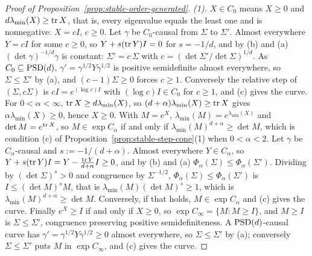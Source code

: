 \begin{proof}[Proof of Proposition~\ref{prop:stable-order-generated}]
\emph{(1).} $X \in C_0$ means $X \ge 0$ and $d\lambda_{\min}(X) \ge \operatorname{tr} X$, that is, every eigenvalue equals the
least one and is nonnegative: $X = cI$, $c \ge 0$. Let $\gamma$ be $C_0$-causal from $\Sigma$ to $\Sigma'$.
Almost everywhere $Y = cI$ for some $c \ge 0$, so $Y + s(\operatorname{tr} Y)I = 0$ for $s = -1/d$, and by (b) and (a)
$(\det\gamma)^{-1/d}\gamma$ is constant: $\Sigma' = c\,\Sigma$ with $c = (\det\Sigma'/\det\Sigma)^{1/d}$. As
$C_0 \subseteq \mathrm{PSD}(d)$, $\gamma' = \gamma^{1/2}Y\gamma^{1/2}$ is positive semidefinite almost everywhere, so
$\Sigma \le \Sigma'$ by (a), and $(c - 1)\Sigma \ge 0$ forces $c \ge 1$. Conversely the relative step of
$(\Sigma, c\Sigma)$ is $cI = e^{(\log c)I}$ with $(\log c)I \in C_0$ for $c \ge 1$, and (c) gives the curve.
For $0 < \alpha < \infty$, $\operatorname{tr} X \ge d\lambda_{\min}(X)$, so
$(d+\alpha)\lambda_{\min}(X) \ge \operatorname{tr} X$ gives $\alpha\lambda_{\min}(X) \ge 0$, hence $X \ge 0$. With
$M = e^X$, $\lambda_{\min}(M) = e^{\lambda_{\min}(X)}$ and $\det M = e^{\operatorname{tr} X}$, so $M \in \exp C_\alpha$ if and
only if $\lambda_{\min}(M)^{d+\alpha} \ge \det M$, which is condition (c) of Proposition~\ref{prop:stable-step-cone}(1)
when $0 < \alpha < 2$. Let $\gamma$ be $C_\alpha$-causal and $s := -1/(d+\alpha)$. Almost everywhere $Y \in
C_\alpha$, so $Y + s(\operatorname{tr} Y)I = Y - \frac{\operatorname{tr} Y}{d+\alpha}I \ge 0$, and by (b) and (a) $\Phi_\alpha(\Sigma) \le
\Phi_\alpha(\Sigma')$. Dividing by $(\det\Sigma)^s > 0$ and congruence by $\Sigma^{-1/2}$, $\Phi_\alpha(\Sigma)
\le \Phi_\alpha(\Sigma')$ is $I \le (\det M)^sM$, that is $\lambda_{\min}(M)(\det M)^s \ge 1$, which is
$\lambda_{\min}(M)^{d+\alpha} \ge \det M$. Conversely, if that holds, $M \in \exp C_\alpha$ and (c) gives the
curve. Finally $e^X \ge I$ if and only if $X \ge 0$, so $\exp C_\infty = \{M : M \ge I\}$, and
$M \ge I$ is $\Sigma \le \Sigma'$, congruence preserving positive semidefiniteness. A $\mathrm{PSD}(d)$-causal curve has
$\gamma' = \gamma^{1/2}Y\gamma^{1/2} \ge 0$ almost everywhere, so $\Sigma \le \Sigma'$ by (a); conversely
$\Sigma \le \Sigma'$ puts $M$ in $\exp C_\infty$, and (c) gives the curve.


\end{proof}
